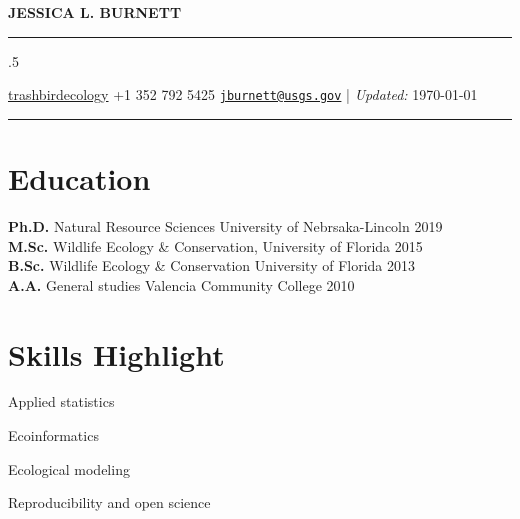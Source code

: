 \documentclass[11pt,]{article}
\providecommand{\tightlist}{%
  \setlength{\itemsep}{0pt}\setlength{\parskip}{0pt}}
\renewenvironment{itemize}{
 \begin{list}{- }{
   \setlength{\leftmargin}{1.5em}
   \setlength{\itemsep}{0pt}
 }
}{
 \end{list}
}
\begin{document}
\centerline{\huge \bf JESSICA L. BURNETT}

\vspace{2 mm}

\hrule

\vspace{2 mm}


\moveleft.5\hoffset\centerline{ 
\faGithub \hspace{1 mm} \href{http://github.com/trashbirdecology}{\color{black} trashbirdecology} \hspace{1 mm}   
 \faMobile \hspace{1 mm}  +1 352 792 5425  \hspace{1 mm}  
\faEnvelopeO \hspace{1 mm} \href{mailto:}{\color{black} \href{mailto:jburnett@usgs.gov}{\nolinkurl{jburnett@usgs.gov}}} \hspace{1 mm} 
  | \emph{Updated:} \today}


\vspace{2 mm}

\hrule

\hypertarget{education}{%
\section{Education}\label{education}}

\textbf{Ph.D.} Natural Resource Sciences University of Nebrsaka-Lincoln
\hfill 2019\\
\textbf{M.Sc.} Wildlife Ecology \& Conservation, University of Florida
\hfill 2015\\
\textbf{B.Sc.} Wildlife Ecology \& Conservation University of Florida
\hfill 2013\\
\textbf{A.A.} General studies Valencia Community College \hfill 2010

\hypertarget{skills-highlight}{%
\section{Skills Highlight}\label{skills-highlight}}

\begin{itemize}
\tightlist
\item
  Applied statistics
\item
  Ecoinformatics
\item
  Ecological modeling
\item
  Reproducibility and open science 
\end{itemize}
\end{document}
